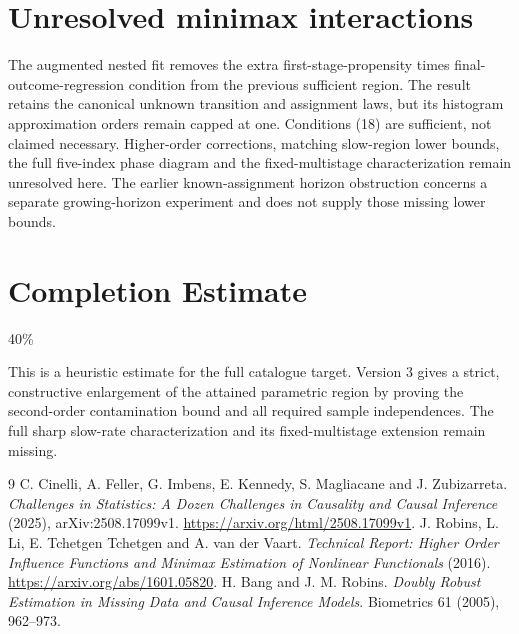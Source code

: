 \documentclass[11pt]{article}
\theoremstyle{definition}
\begin{document}
\section*{Unresolved minimax interactions}
The augmented nested fit removes the extra first-stage-propensity times
final-outcome-regression condition from the previous sufficient region.
The result retains the canonical unknown transition and assignment laws,
but its histogram approximation orders remain capped at one. Conditions
(18) are sufficient, not claimed necessary. Higher-order corrections,
matching slow-region lower bounds, the full five-index phase diagram and
the fixed-multistage characterization remain unresolved here. The earlier
known-assignment horizon obstruction concerns a separate growing-horizon
experiment and does not supply those missing lower bounds.

\section{Completion Estimate}
40\%

This is a heuristic estimate for the full catalogue target. Version 3 gives
a strict, constructive enlargement of the attained parametric region by
proving the second-order contamination bound and all required sample
independences. The full sharp slow-rate characterization and its
fixed-multistage extension remain missing.

\begin{thebibliography}{9}
 C. Cinelli, A. Feller, G. Imbens, E. Kennedy, S. Magliacane and J. Zubizarreta.
\emph{Challenges in Statistics: A Dozen Challenges in Causality and Causal Inference} (2025), arXiv:2508.17099v1.
\url{https://arxiv.org/html/2508.17099v1}.
 J. Robins, L. Li, E. Tchetgen Tchetgen and A. van der Vaart.
\emph{Technical Report: Higher Order Influence Functions and Minimax Estimation of Nonlinear Functionals} (2016).
\url{https://arxiv.org/abs/1601.05820}.
 H. Bang and J. M. Robins.
\emph{Doubly Robust Estimation in Missing Data and Causal Inference Models}.
Biometrics 61 (2005), 962--973.
\end{thebibliography}
\end{document}
